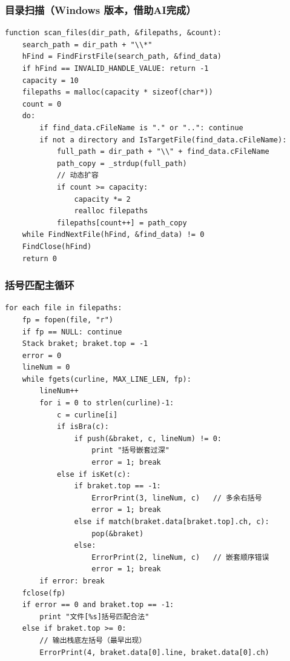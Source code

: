 \documentclass[UTF8]{ctexart}
\begin{document}
\subsubsection{目录扫描（Windows 版本，借助AI完成）}
\begin{lstlisting}
function scan_files(dir_path, &filepaths, &count):
    search_path = dir_path + "\\*"
    hFind = FindFirstFile(search_path, &find_data)
    if hFind == INVALID_HANDLE_VALUE: return -1
    capacity = 10
    filepaths = malloc(capacity * sizeof(char*))
    count = 0
    do:
        if find_data.cFileName is "." or "..": continue
        if not a directory and IsTargetFile(find_data.cFileName):
            full_path = dir_path + "\\" + find_data.cFileName
            path_copy = _strdup(full_path)
            // 动态扩容
            if count >= capacity:
                capacity *= 2
                realloc filepaths
            filepaths[count++] = path_copy
    while FindNextFile(hFind, &find_data) != 0
    FindClose(hFind)
    return 0
\end{lstlisting}

\subsubsection{括号匹配主循环}
\begin{lstlisting}
for each file in filepaths:
    fp = fopen(file, "r")
    if fp == NULL: continue
    Stack braket; braket.top = -1
    error = 0
    lineNum = 0
    while fgets(curline, MAX_LINE_LEN, fp):
        lineNum++
        for i = 0 to strlen(curline)-1:
            c = curline[i]
            if isBra(c):
                if push(&braket, c, lineNum) != 0:
                    print "括号嵌套过深"
                    error = 1; break
            else if isKet(c):
                if braket.top == -1:
                    ErrorPrint(3, lineNum, c)   // 多余右括号
                    error = 1; break
                else if match(braket.data[braket.top].ch, c):
                    pop(&braket)
                else:
                    ErrorPrint(2, lineNum, c)   // 嵌套顺序错误
                    error = 1; break
        if error: break
    fclose(fp)
    if error == 0 and braket.top == -1:
        print "文件[%s]括号匹配合法"
    else if braket.top >= 0:
        // 输出栈底左括号（最早出现）
        ErrorPrint(4, braket.data[0].line, braket.data[0].ch)
\end{lstlisting}
\end{document}
